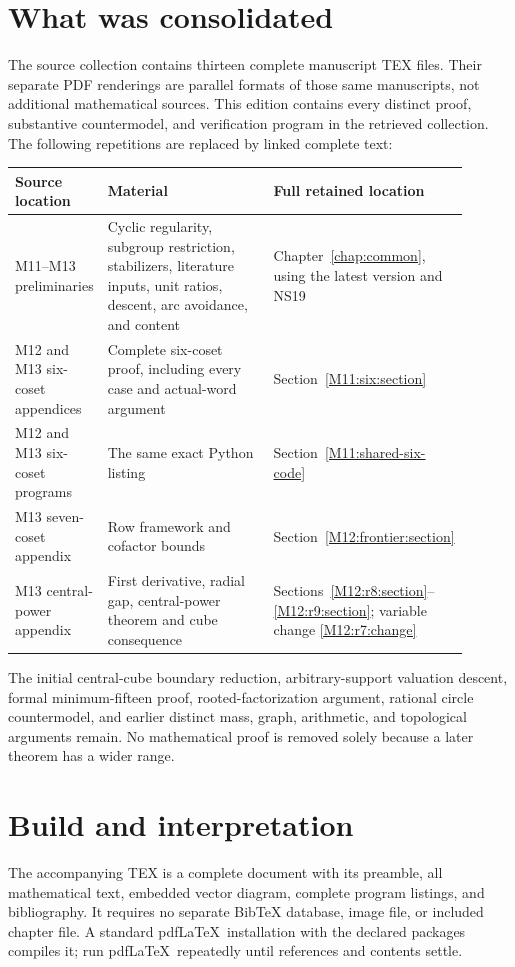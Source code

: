 \documentclass[11pt,a4paper,oneside]{report}
\theoremstyle{definition}
\theoremstyle{remark}
\begin{document}
\section{What was consolidated}
The source collection contains thirteen complete manuscript TEX
files. Their separate PDF renderings are parallel formats of those
same manuscripts, not additional mathematical sources. This edition
contains every distinct proof, substantive countermodel, and
verification program in the retrieved collection. The following
repetitions are replaced by linked complete text:
\begin{longtable}{P{0.20\linewidth}P{0.37\linewidth}P{0.33\linewidth}}
\toprule Source location & Material & Full retained location\\
\midrule\endhead
M11--M13 preliminaries &
Cyclic regularity, subgroup restriction, stabilizers, literature
inputs, unit ratios, descent, arc avoidance, and content &
Chapter~\ref{chap:common}, using the latest version and NS19\\
M12 and M13 six-coset appendices &
Complete six-coset proof, including every case and actual-word argument &
Section~\ref{M11:six:section}\\
M12 and M13 six-coset programs &
The same exact Python listing &
Section~\ref{M11:shared-six-code}\\
M13 seven-coset appendix &
Row framework and cofactor bounds &
Section~\ref{M12:frontier:section}\\
M13 central-power appendix &
First derivative, radial gap, central-power theorem and cube consequence &
Sections~\ref{M12:r8:section}--\ref{M12:r9:section};
variable change \eqref{M12:r7:change}\\
\bottomrule
\end{longtable}
The initial central-cube boundary reduction, arbitrary-support
valuation descent, formal minimum-fifteen proof, rooted-factorization
argument, rational circle countermodel, and earlier distinct
mass, graph, arithmetic, and topological arguments remain.
No mathematical proof is removed solely because a later theorem
has a wider range.

\section{Build and interpretation}
The accompanying TEX is a complete document with its preamble,
all mathematical text, embedded vector diagram, complete program
listings, and bibliography. It requires no separate BibTeX
database, image file, or included chapter file. A standard
pdf\LaTeX\ installation with the declared packages compiles it;
run pdf\LaTeX\ repeatedly until references and contents settle.
\end{document}
